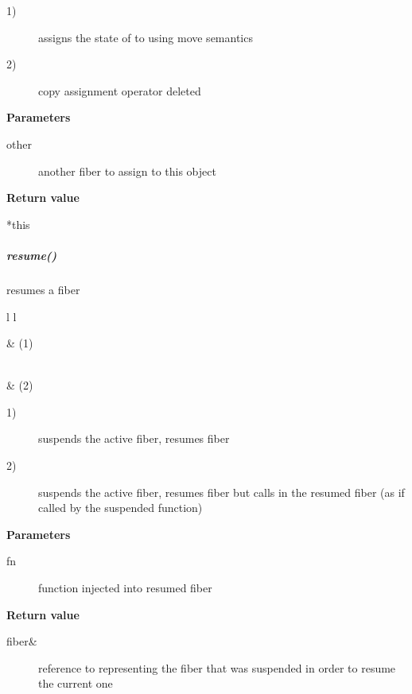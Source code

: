 \begin{description}
    \item[1)] assigns the state of  to  using move semantics
    \item[2)] copy assignment operator deleted
\end{description}

{\bfseries Parameters}
\begin{description}
    \item[other]   another fiber to assign to this object\\
\end{description}

{\bfseries Return value}
\begin{description}
    \item[*this]
\end{description}


\subparagraph*{resume()}
resumes a fiber\\

\begin{tabular}{ l l }
    \midrule

     & (1)\\

    \midrule

    \\
     & (2)\\

    \midrule
\end{tabular}

\begin{description}
    \item[1)] suspends the active fiber, resumes fiber 
    \item[2)] suspends the active fiber, resumes fiber 
              but calls  in the resumed fiber (as if called by the
              suspended function)
\end{description}

{\bfseries Parameters}
\begin{description}
    \item[fn] function injected into resumed fiber\\
\end{description}

{\bfseries Return value}
\begin{description}
    \item[fiber\&] reference to  representing the fiber that was
                 suspended in order to resume the current one
\end{description}

